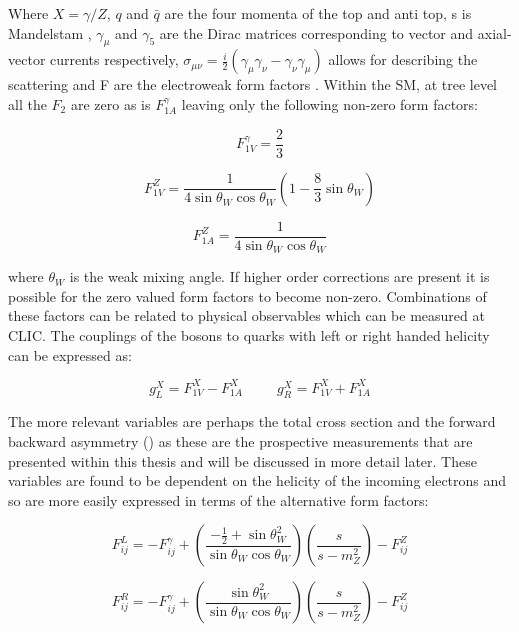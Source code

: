 Where $X=\gamma /Z$, $q$ and $\bar{q}$ are the four momenta of the top and anti top, s is Mandelstam , $\gamma_\mu$ and $\gamma_5$ are the Dirac matrices corresponding to vector and axial-vector currents respectively, $\sigma_{\mu\nu}=\frac{i}{2}(\gamma_\mu \gamma_\nu -\gamma_\nu \gamma_\mu)$ allows for describing the scattering and F are the electroweak form factors \cite{Amjad:2015mma}. Within the \ac{SM}, at tree level all the $F_2$ are zero as is $F_{1A}^{\gamma}$ leaving only the following non-zero form factors:

\begin{equation}
F_{1V}^{\gamma}=\frac{2}{3}
\end{equation}

\begin{equation}
F_{1V}^{Z}=\frac{1}{4\sin\theta_{W}\cos\theta_{W}}(1-\frac{8}{3}\sin\theta_{W})
\end{equation}

\begin{equation}
F_{1A}^{Z}=\frac{1}{4\sin\theta_{W}\cos\theta_{W}}
\end{equation}

where $\theta_W$ is the weak mixing angle. If higher order corrections are present it is possible for the zero valued form factors to become non-zero. Combinations of these factors can be related to physical observables which can be measured at CLIC. The couplings of the bosons to quarks with left or right handed helicity can be expressed as:

\begin{equation}
g_L^X = F_{1V}^{X} - F_{1A}^{X} ~~~~~~~~~~~ g_R^X = F_{1V}^{X} + F_{1A}^{X}
\end{equation}

The more relevant variables are perhaps the total cross section and the forward backward asymmetry (\afb) as these are the prospective measurements that are presented within this thesis and will be discussed in more detail later. These variables are found to be dependent on the helicity of the incoming electrons\cite{Schmidt:1995m} and so are more easily expressed in terms of the alternative form factors:

\begin{equation}
F_{ij}^{L} = -F_{ij}^{\gamma} +(\frac{-\frac{1}{2} +\sin\theta_W^2}{\sin\theta_W\cos\theta_W})(\frac{s}{s-m_Z^2}) -F_{ij}^{Z}
\end{equation}

\begin{equation}
F_{ij}^{R} = -F_{ij}^{\gamma} +(\frac{\sin\theta_W^2}{\sin\theta_W\cos\theta_W})(\frac{s}{s-m_Z^2}) -F_{ij}^{Z}
\end{equation}

